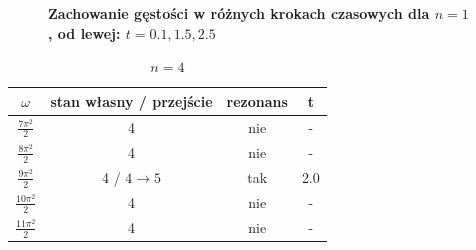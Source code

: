 \documentclass[11pt,a4paper]{article}
\begin{document}
\begin{figure}[ht!]
\begin{multicols}{3}
    \end{multicols}
    \caption{\textbf{Zachowanie gęstości w różnych krokach czasowych dla $n=1$, od lewej: $t=0.1,1.5,2.5$}}
\end{figure}

\begin{table}[h!]
\vspace{1.5cm}
\begin{center}
\begin{tabular}{|| c | c | c | c ||}
    \hline
    $\omega$ & stan własny / przejście & rezonans & t\\
    \hline
    $\frac{7\pi^2}{2}$ & 4 & nie & -\\
    \hline
    $\frac{8\pi^2}{2}$ & 4 & nie & -\\
    \hline
    $\frac{9\pi^2}{2}$ & 4 / $4\rightarrow5$ & tak & 2.0\\
    \hline
    $\frac{10\pi^2}{2}$ & 4 & nie & -\\
    \hline
    $\frac{11\pi^2}{2}$ & 4 & nie & -\\
    \hline
\end{tabular}
\caption{$n=4$}
\end{center}
\end{table}
\end{document}
